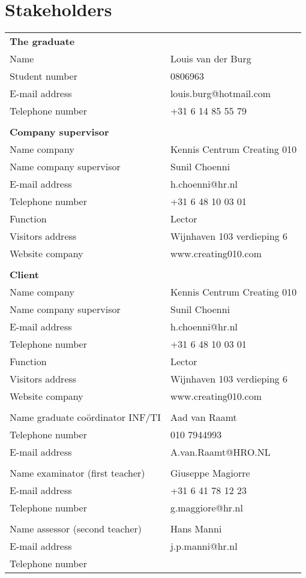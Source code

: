 \chapter{Stakeholders}
   \begin{tabular}
      { l l }
      \textbf{The graduate} & \\
      Name & Louis van der Burg \\
      Student number & 0806963 \\
      E-mail address & louis.burg@hotmail.com \\
      Telephone number & +31 6 14 85 55 79 \\
      & \\
      \textbf{Company supervisor} & \\
      Name company & Kennis Centrum Creating 010 \\
      Name company supervisor & Sunil Choenni \\
      E-mail address & h.choenni@hr.nl \\
      Telephone number & +31 6 48 10 03 01  \\
      Function & Lector \\
      Visitors address & Wijnhaven 103 verdieping 6 \\
      Website company & www.creating010.com \\
      & \\
      \textbf{Client} & \\
      Name company & Kennis Centrum Creating 010 \\
      Name company supervisor & Sunil Choenni \\
      E-mail address & h.choenni@hr.nl \\
      Telephone number & +31 6 48 10 03 01  \\
      Function & Lector \\
      Visitors address & Wijnhaven 103 verdieping 6 \\
      Website company & www.creating010.com \\
      & \\
      Name graduate coördinator INF/TI & Aad van Raamt \\
      Telephone number & 010 7944993 \\
      E-mail address & A.van.Raamt@HRO.NL \\
      & \\
      Name examinator (first teacher) & Giuseppe Magiorre \\
      E-mail address & +31 6 41 78 12 23 \\
      Telephone number & g.maggiore@hr.nl \\
      & \\
      Name assessor (second teacher) & Hans Manni \\
      E-mail address & j.p.manni@hr.nl \\
      Telephone number & \\
   \end{tabular}
